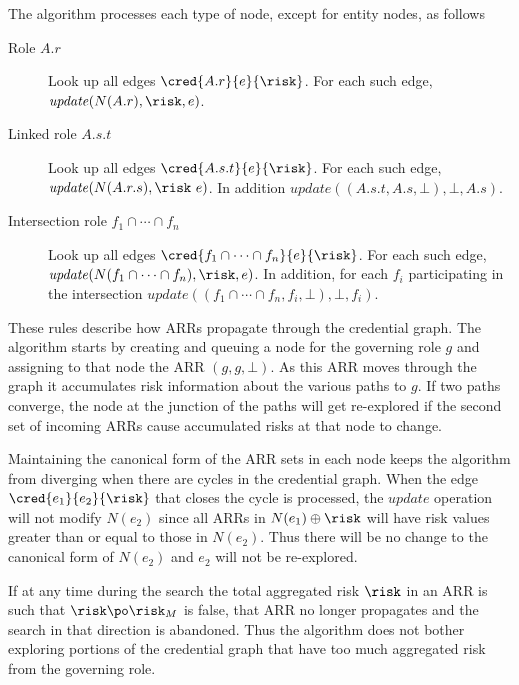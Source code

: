 The algorithm processes each type of node, except for entity nodes, as follows
\begin{description}
\item[Role $A.r$] Look up all edges $\cred{A.r}{e}{\risk}$. For each such edge,
  $\mathit{update}(N(A.r), \risk, e)$.
\item[Linked role $A.s.t$] Look up all edges $\cred{A.s.t}{e}{\risk}$. For each such edge,
  $\mathit{update}(N(A.r.s), \risk\ e)$. In addition $\mathit{update}((A.s.t, A.s, \bot), \bot,
  A.s)$.
\item[Intersection role $f_1 \cap \cdots \cap f_n$] Look up all edges $\cred{f_1 \cap \cdots
    \cap f_n}{e}{\risk}$. For each such edge, $\mathit{update}(N(f_1 \cap \cdots \cap f_n),
  \risk, e)$. In addition, for each $f_i$ participating in the intersection
  $\mathit{update}((f_1 \cap \cdots \cap f_n, f_i, \bot), \bot, f_i)$.
\end{description}

These rules describe how ARRs propagate through the credential graph. The algorithm starts by
creating and queuing a node for the governing role $g$ and assigning to that node the ARR $(g,
g, \bot)$. As this ARR moves through the graph it accumulates risk information about the various
paths to $g$. If two paths converge, the node at the junction of the paths will get re-explored
if the second set of incoming ARRs cause accumulated risks at that node to change.

Maintaining the canonical form of the ARR sets in each node keeps the algorithm from diverging
when there are cycles in the credential graph. When the edge $\cred{e_1}{e_2}{\risk}$ that
closes the cycle is processed, the $\mathit{update}$ operation will not modify $N(e_2)$ since
all ARRs in $N(e_1) \oplus \risk$ will have risk values greater than or equal to those in
$N(e_2)$. Thus there will be no change to the canonical form of $N(e_2)$ and $e_2$ will not be
re-explored.

If at any time during the search the total aggregated risk $\risk$ in an ARR is such that $\risk
\po \risk_M$ is false, that ARR no longer propagates and the search in that direction is
abandoned. Thus the algorithm does not bother exploring portions of the credential graph that
have too much aggregated risk from the governing role.

